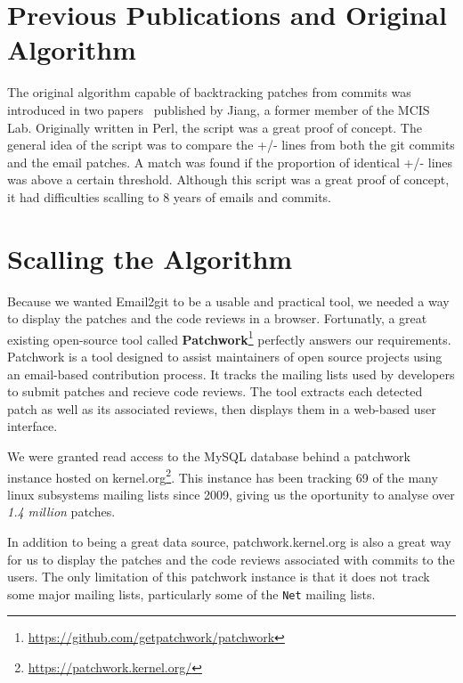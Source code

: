 \label{sec:Theme2}


\section{Previous Publications and Original Algorithm}

The original algorithm capable of backtracking patches from commits was introduced in two papers~\citep{msr13jojo,jiang14} published by Jiang, a former member of the MCIS Lab. Originally written in Perl, the script was a great proof of concept. The general idea of the script was to compare the +/- lines from both the git commits and the email patches. A match was found if the proportion of identical +/- lines was above a certain threshold. Although this script was a great proof of concept, it had difficulties scalling to 8 years of emails and commits. 



\section{Scalling the Algorithm}

Because we wanted Email2git to be a usable and practical tool, we needed a way to display the patches and the code reviews in a browser. Fortunatly, a great existing open-source tool called \textbf{Patchwork}\footnote{\url{https://github.com/getpatchwork/patchwork}} perfectly answers our requirements. Patchwork is a tool designed to assist maintainers of open source projects using an email-based contribution process. It tracks the mailing lists used by developers to submit patches and recieve code reviews. The tool extracts each detected patch as well as its associated reviews, then displays them in a web-based user interface. 

We were granted read access to the MySQL database behind a patchwork instance hosted on kernel.org\footnote{\url{https://patchwork.kernel.org/}}. This instance has been tracking 69 of the many linux subsystems mailing lists since 2009, giving us the oportunity to analyse over \textit{1.4 million} patches.

In addition to being a great data source, patchwork.kernel.org is also a great way for us to display the patches and the code reviews associated with commits to the users. The only limitation of this patchwork instance is that it does not track some major mailing lists, particularly some of the \texttt{Net} mailing lists. 


